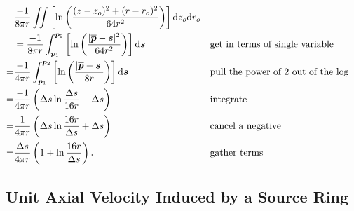 
\begin{align}
&\frac{-1}{8\pi r} \iint\left[ \ln\left(\frac{(z-z_o)^2 + (r-r_o)^2}{64r^2}\right)\right] \mathrm{d} z_o \mathrm{d} r_o\\
&=
    \frac{-1}{8\pi r} \int_{\bm{p}_1}^{\bm{p}_2}\left[ \ln\left(\frac{|\overline{\bm{p}}-\bm{s}|^2}{64r^2}\right)\right] \mathrm{d}\bm{s} && \text{get in terms of single variable}\\
=&
\frac{-1}{4\pi r} \int_{\bm{p}_1}^{\bm{p}_2}\left[ \ln\left(\frac{|\overline{\bm{p}}-\bm{s}|}{8r}\right)\right] \mathrm{d}\bm{s} && \text{pull the power of 2 out of the log}\\
=&
\frac{-1}{4\pi r} \left( \Delta s \ln\frac{\Delta s}{16 r} - \Delta s\right) && \text{integrate}\\
=&
\frac{1}{4\pi r} \left( \Delta s \ln\frac{16 r}{\Delta s} + \Delta s\right) && \text{cancel a negative}\\
=&
\frac{\Delta s}{4\pi r} \left( 1 + \ln\frac{16 r}{\Delta s}\right). && \text{gather terms}
\end{align}






\subsection{Unit Axial Velocity Induced by a Source Ring}




